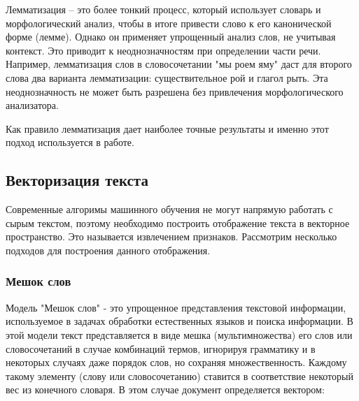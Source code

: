 \documentclass[12pt]{article}
\begin{document}
Лемматизация -- это более тонкий процесс, который использует словарь и морфологический анализ, чтобы в итоге привести слово к его канонической форме (лемме). Однако он применяет упрощенный анализ слов, не учитывая контекст. Это приводит к неоднозначностям при определении части речи. Например, лемматизация слов в словосочетании "мы роем яму" даст для второго слова два варианта лемматизации: существительное рой и глагол рыть. Эта неоднозначность не может быть разрешена без привлечения морфологического анализатора.

Как правило лемматизация дает наиболее точные результаты и именно этот подход используется в работе.

\subsection*{Векторизация текста}
Современные алгоримы машинного обучения не могут напрямую работать с сырым текстом, поэтому необходимо построить отображение текста в векторное пространство. Это называется извлечением признаков. Рассмотрим несколько подходов для построения данного отображения.

\subsubsection*{Мешок слов}

Модель "Мешок слов" - это упрощенное представления текстовой информации, используемое в задачах обработки естественных языков и поиска информации. В этой модели текст представляется в виде мешка (мультимножества) его слов или словосочетаний в случае комбинаций термов, игнорируя грамматику и в некоторых случаях даже порядок слов, но сохраняя множественность. Каждому такому элементу (слову или словосочетанию) ставится в соответствие некоторый вес из конечного словаря. В этом случае документ определяется вектором:
 
\end{document}
